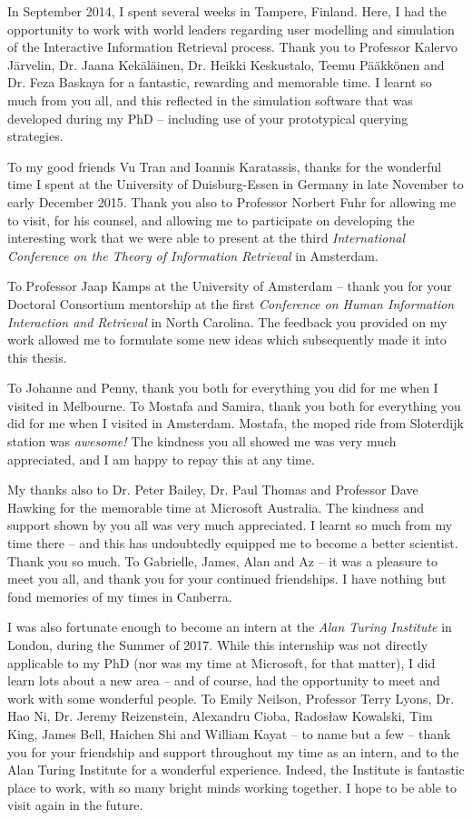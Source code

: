 \begin{preamble}
In September 2014, I spent several weeks in Tampere, Finland. Here, I had the opportunity to work with world leaders regarding user modelling and simulation of the Interactive Information Retrieval process. Thank you to Professor Kalervo J\"{a}rvelin, Dr. Jaana Kek\"{a}l\"{a}inen, Dr. Heikki Keskustalo, Teemu P\"{a}\"{a}kk\"{o}nen and Dr. Feza Baskaya for a fantastic, rewarding and memorable time. I learnt so much from you all, and this reflected in the simulation software that was developed during my PhD -- including use of your prototypical querying strategies.

To my good friends Vu Tran and Ioannis Karatassis, thanks for the wonderful time I spent at the University of Duisburg-Essen in Germany in late November to early December 2015. Thank you also to Professor Norbert Fuhr for allowing me to visit, for his counsel, and allowing me to participate on developing the interesting work that we were able to present at the third \emph{International Conference on the Theory of Information Retrieval} in Amsterdam.

To Professor Jaap Kamps at the University of Amsterdam -- thank you for your Doctoral Consortium mentorship at the first \emph{Conference on Human Information Interaction and Retrieval} in North Carolina. The feedback you provided on my work allowed me to formulate some new ideas which subsequently made it into this thesis.

To Johanne and Penny, thank you both for everything you did for me when I visited in Melbourne. To Mostafa and Samira, thank you both for everything you did for me when I visited in Amsterdam. Mostafa, the moped ride from Sloterdijk station was \emph{awesome!} The kindness you all showed me was very much appreciated, and I am happy to repay this at any time.

My thanks also to Dr. Peter Bailey, Dr. Paul Thomas and Professor Dave Hawking for the memorable time at Microsoft Australia. The kindness and support shown by you all was very much appreciated. I learnt so much from my time there -- and this has undoubtedly equipped me to become a better scientist. Thank you so much. To Gabrielle, James, Alan and Az -- it was a pleasure to meet you all, and thank you for your continued friendships. I have nothing but fond memories of my times in Canberra.

I was also fortunate enough to become an intern at the \emph{Alan Turing Institute} in London, during the Summer of 2017. While this internship was not directly applicable to my PhD (nor was my time at Microsoft, for that matter), I did learn lots about a new area -- and of course, had the opportunity to meet and work with some wonderful people. To Emily Neilson, Professor Terry Lyons, Dr. Hao Ni, Dr. Jeremy Reizenstein, Alexandru Cioba, Rados\l{}aw Kowalski, Tim King, James Bell, Haichen Shi and William Kayat  -- to name but a few -- thank you for your friendship and support throughout my time as an intern, and to the Alan Turing Institute for a wonderful experience. Indeed, the Institute is fantastic place to work, with so many bright minds working together. I hope to be able to visit again in the future.


\end{preamble}
